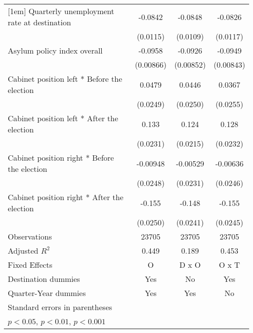 \begin{table}[htbp]
\begin{tabular}{l*{3}{c}}
[1em]
Quarterly unemployment rate at destination&     -0.0842\sym{***}&     -0.0848\sym{***}&     -0.0826\sym{***}\\
                    &    (0.0115)         &    (0.0109)         &    (0.0117)         \\
[1em]
Asylum policy index overall&     -0.0958\sym{***}&     -0.0926\sym{***}&     -0.0949\sym{***}\\
                    &   (0.00866)         &   (0.00852)         &   (0.00843)         \\
[1em]
Cabinet position left * Before the election&      0.0479         &      0.0446         &      0.0367         \\
                    &    (0.0249)         &    (0.0250)         &    (0.0255)         \\
[1em]
Cabinet position left * After the election&       0.133\sym{***}&       0.124\sym{***}&       0.128\sym{***}\\
                    &    (0.0231)         &    (0.0215)         &    (0.0232)         \\
[1em]
Cabinet position right * Before the election&    -0.00948         &    -0.00529         &    -0.00636         \\
                    &    (0.0248)         &    (0.0231)         &    (0.0246)         \\
[1em]
Cabinet position right * After the election&      -0.155\sym{***}&      -0.148\sym{***}&      -0.155\sym{***}\\
                    &    (0.0250)         &    (0.0241)         &    (0.0245)         \\
\hline
Observations        &       23705         &       23705         &       23705         \\
Adjusted \(R^{2}\)  &       0.449         &       0.189         &       0.453         \\
Fixed Effects       &           O         &       D x O         &       O x T         \\
Destination dummies &         Yes         &          No         &         Yes         \\
Quarter-Year dummies&         Yes         &         Yes         &          No         \\
\hline\hline
\multicolumn{4}{l}{\footnotesize Standard errors in parentheses}\\
\multicolumn{4}{l}{\footnotesize \sym{*} \(p<0.05\), \sym{**} \(p<0.01\), \sym{***} \(p<0.001\)}\\
\end{tabular}
\end{table}
